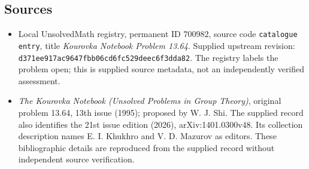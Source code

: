 \documentclass[11pt]{article}
\begin{document}
\subsection{Sources}
\begin{itemize}
\item Local UnsolvedMath registry, permanent ID \(700982\), source code \texttt{catalogue entry}, title \emph{Kourovka Notebook Problem 13.64}. Supplied upstream revision: \texttt{d371ee917ac9647fbb06cd6fc529deec6f3dda82}. The registry labels the problem open; this is supplied source metadata, not an independently verified assessment.
\item \emph{The Kourovka Notebook (Unsolved Problems in Group Theory)}, original problem 13.64, 13th issue (1995); proposed by W. J. Shi. The supplied record also identifies the 21st issue edition (2026), arXiv:1401.0300v48. Its collection description names E. I. Khukhro and V. D. Mazurov as editors. These bibliographic details are reproduced from the supplied record without independent source verification.
\end{itemize}
\end{document}
